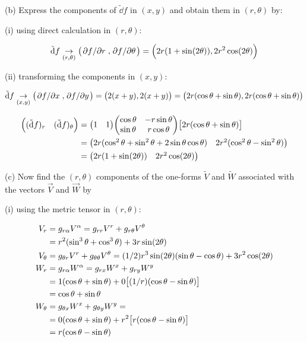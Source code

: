 \message{ !name(gr-ch5-notes.tex)}\documentclass[gr-notes.tex]{subfiles}
\begin{document}
(b)
Express the components of $\tilde{\dd}f$ in $(x,y)$ and obtain them in $(r,\theta)$ by:

(i) using direct calculation in $(r, \theta)$:

\begin{displaymath}
  \tilde{\dd}f \underset{(r,\theta)}{\to}
  \qty( \pdv*{f}{r}, \pdv*{f}{\theta} ) =
  \qty( 2 r (1 + \sin(2 \theta)), 2 r^2 \cos(2 \theta) )
\end{displaymath}

(ii) transforming the components in $(x, y)$:

\begin{displaymath}
  \tilde{\dd}f \underset{(x,y)}{\to}
  \qty( \pdv*{f}{x}, \pdv*{f}{y} ) =
  \qty( 2 (x+y), 2 (x+y) ) =
  \qty( 2 r (\cos\theta + \sin\theta), 2 r (\cos\theta + \sin\theta))
\end{displaymath}

\begin{align*}
  \mqty( (\tilde{\dd}f)_r & (\tilde{\dd}f)_\theta ) &=
  \mqty( 1 & 1 )
  \mqty( \cos\theta & -r\sin\theta \\ \sin\theta & r\cos\theta )
  \qty[ 2 r (\cos\theta + \sin\theta) ]
  \\ &=
  \mqty( 2 r  (\cos^2\theta + \sin^2\theta + 2 \sin\theta\cos\theta) &
         2 r^2 (\cos^2\theta - \sin^2\theta) )
  \\ &=
  \mqty( 2 r (1 + \sin(2 \theta)) & 2 r^2 \cos(2 \theta) )
\end{align*}


(c)
Now find the $(r,\theta)$ components of the one-forms $\tilde{V}$ and $\tilde{W}$ associated with the vectors $\vec{V}$ and $\vec{W}$ by

(i)
using the metric tensor in $(r,\theta)$:


\begin{align*}
  V_r &=
  g_{r\alpha} V^\alpha =
  g_{rr} V^r + g_{r\theta} V^\theta
  \\ &=
  r^2 (\sin^3\theta + \cos^3\theta) + 3 r \sin(2\theta)
  \\
  V_\theta &=
  g_{\theta r} V^r + g_{\theta\theta} V^\theta =
  (1/2) r^3 \sin(2\theta) (\sin\theta - \cos\theta) +
  3 r^2 \cos(2\theta)
  \\
  W_r &=
  g_{r\alpha} W^\alpha =
  g_{rx} W^x + g_{ry} W^y
  \\ &=
  1 (\cos\theta + \sin\theta) +
  0 \qty[ (1/r) (\cos\theta - \sin\theta) ]
  \\ &=
  \cos\theta + \sin\theta
  \\
  W_\theta &=
  g_{\theta x} W^x + g_{\theta y} W^y =
  \\ &=
  0 (\cos\theta + \sin\theta) +
  r^2 \qty[ r (\cos\theta - \sin\theta) ]
  \\ &=
  r (\cos\theta - \sin\theta)
\end{align*}
\end{document}
